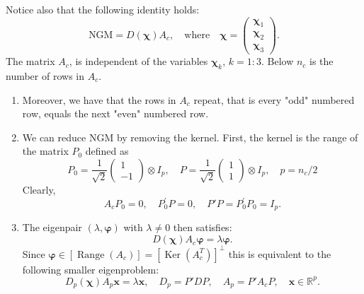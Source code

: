 \documentclass[12pt]{amsart}
\theoremstyle{definition}
\begin{document}
Notice also that the following identity holds:
\begin{equation}
    \text{NGM}=D(\bm{\chi})A_c, \quad\mbox{where}\quad \bm{\chi}=
\begin{pmatrix}
    \bm{\chi}_1\\
    \bm{\chi}_2\\
    \bm{\chi}_3    
\end{pmatrix}.
\end{equation}
The matrix $A_c$, is independent of the variables $\bm{\chi}_k$, $k=1:3$.
Below $n_c$ is the number of rows in $A_c$.
\begin{enumerate}
    \item Moreover, we have that the rows in $A_c$ repeat, that is every "odd" numbered row, equals the next "even" numbered row. 
    \item We can reduce $\text{NGM}$ by removing the kernel. First, the kernel is the range of the matrix $P_0$ defined as
    \begin{equation}
        P_0=
        \frac{1}{\sqrt{2}}\begin{pmatrix}
        1\\-1
        \end{pmatrix}\otimes I_{p},\quad
        P=\frac{1}{\sqrt{2}}\begin{pmatrix}
        1\\1
        \end{pmatrix}\otimes I_{p},\quad p=n_c/2 
    \end{equation}
    Clearly, 
    \begin{equation}
        A_cP_0=0, \quad P_0^{\prime}P=0, 
        \quad P'P=P_0^{\prime}P_0=I_{p}.     
    \end{equation}
    \item The eigenpair $(\lambda,\bm{\varphi})$ with $\lambda \neq 0$ then 
    satisfies: 
    \[
    D(\bm{\chi})A_c \bm{\varphi}=\lambda \bm \varphi.
    \]
    Since $\bm{\varphi}\in[\operatorname{Range}(A_c)]=[\operatorname{Ker}(A_c^T)]^\perp$ this is equivalent to the following smaller eigenproblem:
    \begin{equation}
        D_p(\bm{\chi}) A_p\bm{x} =\lambda \bm{x}, \quad D_p=P'DP, \quad A_p=P'A_cP, \quad \bm{x}\in \mathbb{R}^p. 
    \end{equation}
\end{enumerate}
\end{document}
